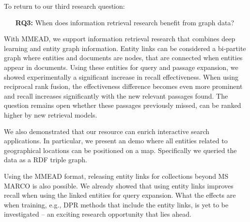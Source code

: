 To return to our third research question:
\begin{itemize}
	\item[\textbf{RQ3:}] When does information retrieval research benefit from graph data?
\end{itemize}   

With MMEAD, we support information retrieval research that combines deep learning and entity graph information. Entity links can be considered a bi-partite graph where entities and documents are nodes, that are connected when entities appear in documents. Using these entities for query and passage expansion, we showed experimentally a significant increase in recall effectiveness. When using reciprocal rank fusion, the effectiveness difference becomes even more prominent and recall increases significantly with the new relevant passages found. The question remains open whether these passages previously missed, can be ranked higher by new retrieval models.

We also demonstrated that our resource can enrich interactive search applications. In particular, we present an demo where all entities related to geographical locations can be positioned on a map. Specifically we queried the data as a RDF triple graph.

Using the MMEAD format, releasing entity links for collections beyond MS MARCO is also possible. We already showed that using entity links improves recall when using the linked entities for query expansion. What the effects are when training, e.g., DPR methods that include the entity links, is yet to be investigated -- an exciting research opportunity that lies ahead. 
